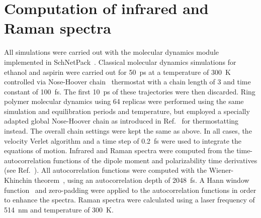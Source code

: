 \documentclass[reprint,
amsmath,amssymb,
 aip,jcp
]{revtex4-2}
\begin{document}
\section{Computation of infrared and Raman spectra}

All simulations were carried out with the molecular dynamics module implemented in SchNetPack~\cite{schutt2018schnet}.
Classical molecular dynamics simulations for ethanol and aspirin were carried out for 50~ps at a temperature of 300~K controlled via Nose-Hoover chain~\cite{martyna1992nhc} thermostat with a chain length of 3 and time constant of 100~fs. The first 10~ps of these trajectories were then discarded.
Ring polymer molecular dynamics using 64 replicas were performed using the same simulation and equilibration periods and temperature, but employed a specially adapted global Nose-Hoover chain as introduced in Ref.~\cite{ceriotti2010stochastic} for thermostatting instead.
The overall chain settings were kept the same as above.
In all cases, the velocity Verlet algorithm and a time step of 0.2~fs were used to integrate the equations of motion.
Infrared and Raman spectra were computed from the time-autocorrelation functions of the dipole moment and polarizability time derivatives (see Ref.~\cite{thomas2013computing}).
All autocorrelation functions were computed with the Wiener-Khinchin theorem~\cite{wiener1930}, using an autocorrelation depth of 2048~fs.
A Hann window function~\cite{6768513} and zero-padding were applied to the autocorrelation functions in order to enhance the spectra.
Raman spectra were calculated using a laser frequency of 514~nm and temperature of 300~K.
\end{document}
